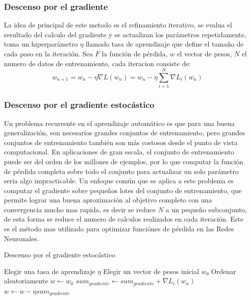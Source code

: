 \documentclass[a4paper,11pt,spanish]{book}
\begin{document}
    \subsubsection{Descenso por el gradiente}
      La idea de principal de este metodo es el refinamiento iterativo, se evalua el resultado del calculo del gradiente y se actualizan los parámetros repetidamente,
      toma un hiperparámetro $\eta$ llamado tasa de aprendizaje que define el tamaño de cada paso en la iteración.
      Sea $F$ la función de pérdida, $w$ el vector de pesos, $N$ el numero de datos de entrenamiento, cada iteracion consiste de:
      \begin{equation}
	w_{n+1} = w_n - \eta \nabla L(w_n)  = w_n - \eta \sum_{i=1}^{N} \nabla L_i(w_n)
      \end{equation}

    \subsubsection{Descenso por el gradiente estocástico}
      Un problema recurrente en el aprendizaje automático es que para una buena generalización, son necesarios grandes conjuntos de entrenamiento,
      pero grandes conjuntos de entrenamiento también son más costosos desde el punto de vista computacional.
      En aplicaciones de gran escala, el conjunto de entrenamiento puede ser del orden de los millones de ejemplos, por lo que computar la función de
      pérdida completa sobre todo el conjunto para actualizar un solo parámetro seria algo impracticable.
      Un enfoque común que se aplica a este problema es computar el gradiente sobre pequeños lotes del conjunto de entrenamiento,
      que permite lograr una buena aproximación al objetivo completo con una convergencia mucho mas rapida, es decir se reduce $N$ a un pequeño subconjunto, de esta forma se reduce el
      numero de calculos realizados en cada iteración.
      Este es el método mas utilizado para optimizar funciónes de pérdida en las Redes Neuronales.

	\begin{algorithm}[h]
	  \caption{Descenso por el gradiente estocástico}
	  \label{SGD}
	  \begin{algorithmic}
	    \State Elegir una tasa de aprendizaje $\eta$
	    \State Elegir un vector de pesos inicial $w_0$
	    \State Ordenar aleatoriamente
	    \State $w \gets w_0$
	    \Repeat
		$sum_{gradiente} \gets sum_{gradiente} + \nabla L_i(w_n)$
	      \EndFor
	      \State $w \gets w - \eta sum_{gradiente}$
	  \end{algorithmic}
	\end{algorithm}
    
\end{document}
